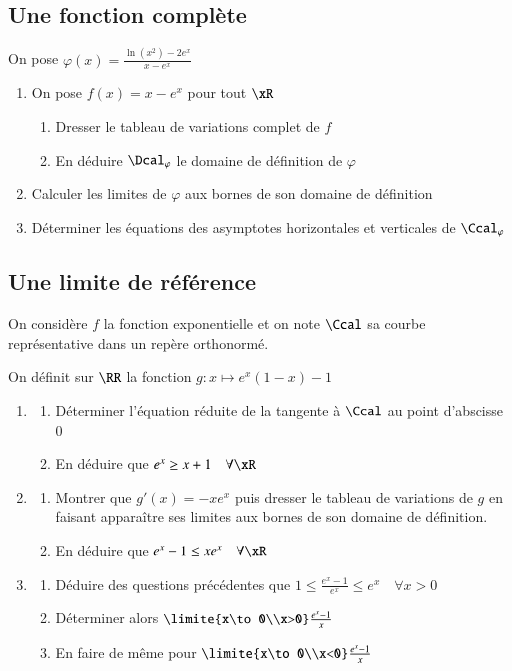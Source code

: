 \documentclass[oneside,12pt]{article}          %
\begin{document}
\subsection{Une fonction complète}
On pose $\varphi(x)=\frac{\ln(x^2)-2e^x}{x-e^x}$
\begin{enumerate}
    \item On pose $f(x)=x-e^x$ pour tout $\xR$
    \begin{enumerate}
        \item Dresser le tableau de variations complet de $f$
        \item En déduire $\Dcal_{\varphi}$ le domaine de définition de $\varphi$
    \end{enumerate}
    \item Calculer les limites de $\varphi$ aux bornes de son domaine de définition
    \item Déterminer les équations des asymptotes horizontales et verticales de $\Ccal_\varphi$
\end{enumerate}



\subsection{Une limite de référence}
On considère $f$ la fonction exponentielle et on note $\Ccal$ sa courbe représentative dans un repère orthonormé.

On définit sur $\RR$ la fonction $g:x\mapsto e^x(1-x)-1$
\begin{enumerate}
	\item \begin{enumerate}
		\item Déterminer l'équation réduite de la tangente à $\Ccal$ au point d'abscisse $0$
		\item En déduire que $e^x\geq x+1 \quad \forall\xR$
	\end{enumerate}
	\item \begin{enumerate}
		\item Montrer que $g'(x)=-xe^x$ puis dresser le tableau de variations de $g$ en faisant apparaître ses limites aux bornes de son domaine de définition.
		\item En déduire que $e^x-1\leq xe^x \quad \forall\xR$
	\end{enumerate}
	\item \begin{enumerate}
		\item Déduire des questions précédentes que $1\leq\frac{e^x-1}{e^x}\leq e^x \quad \forall x>0$
		\item Déterminer alors $\limite{x\to0\\x>0}\frac{e^x-1}{x}$
		\item En faire de même pour $\limite{x\to0\\x<0}\frac{e^x-1}{x}$
	\end{enumerate}
\end{enumerate}
\end{document}
